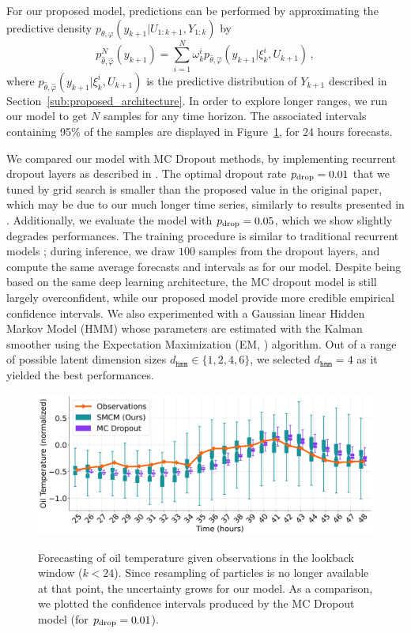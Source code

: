 \documentclass[conference]{IEEEtran}
\begin{document}
For our proposed model, predictions can be performed by approximating the predictive density $p_{\theta,\varphi}(y_{k+1}|U_{1:k+1},Y_{1:k})$ by
$$
	p^N_{\widehat\theta,\widehat\varphi}(y_{k+1})= \sum_{i=1}^{N}\omega_k^i p_{\widehat\theta,\widehat\varphi}(y_{k+1}|\xi_k^i,U_{k+1})\,,
$$
where $ p_{\widehat\theta,\widehat\varphi}(y_{k+1}|\xi_k^i,U_{k+1})$ is the predictive distribution of $Y_{k+1}$ described in Section~\ref{sub:proposed_architecture}.
In order to explore longer ranges, we run our model to get $N$ samples for any time horizon.
The associated intervals containing 95\% of the samples are displayed in Figure~\ref{fig:filter_k+24}, for 24 hours forecasts.

We compared our model with MC Dropout methods, by implementing recurrent dropout layers as described in \cite{Gal2016NIPS}.
The optimal dropout rate $p_\textnormal{drop}=0.01$ that we tuned by grid search is smaller than the proposed value in the original paper, which may be due to our much longer time series, similarly to results presented in \cite{Zhu2017DeepAC}.
Additionally, we evaluate the model with $p_\textnormal{drop}=0.05$, which we show slightly degrades performances.
The training procedure is similar to traditional recurrent models ; during inference, we draw $100$ samples from the dropout layers, and compute the same average forecasts and  intervals as for our model.
Despite being based on the same deep learning architecture, the MC dropout model is still largely overconfident, while our proposed model provide more credible empirical confidence intervals.
We also experimented with a Gaussian linear Hidden Markov Model (HMM) whose parameters are estimated with the Kalman smoother using the Expectation Maximization (EM, \cite{Dempster77EM}) algorithm.
Out of a range of possible latent dimension sizes $d_{\texttt{hmm}} \in \{1, 2, 4, 6\}$, we selected $d_{\texttt{hmm}}=4$ as it yielded the best performances.

\begin{figure}[htpb]
	\centering
	\caption{Forecasting of oil temperature given observations in the lookback window ($k<24$).
		Since resampling of particles is no longer available at that point, the uncertainty grows for our model.
		As a comparison, we plotted the confidence intervals produced by the MC Dropout model (for $p_\textnormal{drop}=0.01$).}
	\includegraphics[width=0.8\linewidth]{filter_kp24_ett.png}
	\label{fig:filter_k+24}
\end{figure}
\end{document}

